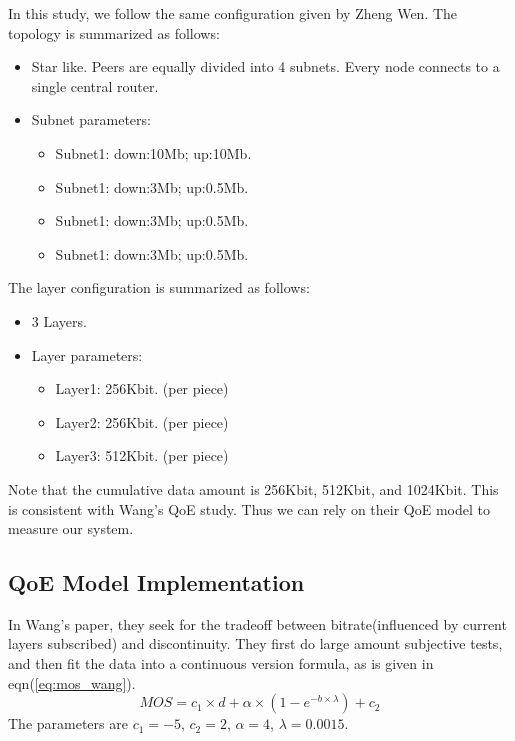 \documentclass[11pt,a4paper]{article}
\begin{document}
In this study, we follow the same configuration given by 
Zheng Wen. The topology is summarized as follows:
\begin{itemize}
	\item Star like. Peers are equally divided into 4 subnets.
	Every node connects to a single central router.  
	\item Subnet parameters:
		\begin{itemize}
			\item Subnet1: down:10Mb; up:10Mb. 
			\item Subnet1: down:3Mb; up:0.5Mb. 
			\item Subnet1: down:3Mb; up:0.5Mb. 
			\item Subnet1: down:3Mb; up:0.5Mb. 
		\end{itemize}
\end{itemize}

The layer configuration is summarized as follows:
\begin{itemize}
	\item 3 Layers. 
	\item Layer parameters:
		\begin{itemize}
			\item Layer1: 256Kbit. (per piece) 
			\item Layer2: 256Kbit. (per piece) 
			\item Layer3: 512Kbit. (per piece) 
		\end{itemize}
\end{itemize}
Note that the cumulative data amount is 256Kbit, 512Kbit, and 1024Kbit. 
This is consistent with Wang's QoE study\cite{wang2011-perceptual}. Thus
we can rely on their QoE model to measure our system. 

\subsection{QoE Model Implementation}
\label{sec:simu_qoe}

In Wang's paper\cite{wang2011-perceptual}, they seek for the tradeoff
between bitrate(influenced by current layers subscribed) and discontinuity. 
They first do large amount subjective tests, and then fit the data into 
a continuous version formula, as is given in eqn(\ref{eq:mos_wang}). 
\begin{equation}
	MOS = c_1 \times d + \alpha \times (1 - e^{-b \times \lambda}) + c_2
	\label{eq:mos_wang}
\end{equation}
The parameters are $c_1=-5$, $c_2=2$, $\alpha=4$, $\lambda=0.0015$. 
\end{document}
